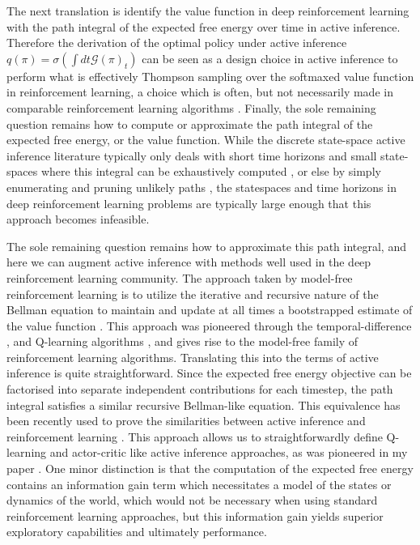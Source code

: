 The next translation is identify the value function in deep reinforcement learning with the path integral of the expected free energy over time in active inference. Therefore the derivation of the optimal policy under active inference $q(\pi) = \sigma(\int dt \mathcal{G}(\pi)_t)$ can be seen as a design choice in active inference to perform what is effectively Thompson sampling over the softmaxed value function in reinforcement learning, a choice which is often, but not necessarily made in comparable reinforcement learning algorithms \citep{osband2015bootstrapped}. Finally, the sole remaining question remains how to compute or approximate the path integral of the expected free energy, or the value function. While the discrete state-space active inference literature typically only deals with short time horizons and small state-spaces where this integral can be exhaustively computed \citep{da2020active}, or else by simply enumerating and pruning unlikely paths \citep{friston2020sophisticated}, the statespaces and time horizons in deep reinforcement learning problems are typically large enough that this approach becomes infeasible. 

The sole remaining question remains how to approximate this path integral, and here we can augment active inference with methods well used in the deep reinforcement learning community. The approach taken by model-free reinforcement learning is to utilize the iterative and recursive nature of the Bellman equation to maintain and update at all times a bootstrapped estimate of the value function \citep{kaelbling1996reinforcement,mnih2013playing}. This approach was pioneered through the temporal-difference \citep{sutton1988learning}, and Q-learning algorithms \citep{watkins1992q}, and gives rise to the model-free family of reinforcement learning algorithms. Translating this into the terms of active inference is quite straightforward. Since the expected free energy objective can be factorised into separate independent contributions for each timestep, the path integral satisfies a similar recursive Bellman-like equation. This equivalence has been recently used to prove the similarities between active inference and reinforcement learning \citep{da2020relationship}. This approach allows us to straightforwardly define Q-learning and actor-critic like active inference approaches, as was pioneered in my paper \citep{millidge2019deep}. One minor distinction is that the computation of the expected free energy contains an information gain term which necessitates a model of the states or dynamics of the world, which would not be necessary when using standard reinforcement learning approaches, but this information gain yields superior exploratory capabilities and ultimately performance.

